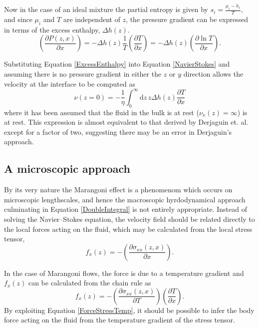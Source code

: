 Now in the case of an ideal mixture the partial entropy is given by $s_{i}=\frac{\mu_{i}-h_{i}}{T}$, and since $\mu_{i}$ and $T$ are independent of $z$, the pressure gradient can be expressed in terms of the excess enthalpy, $\Delta h(z)$.
\begin{equation}
\label{ExcessEnthalpy}
\left(\frac{\partial P(z,x)}{\partial x}\right)= - \Delta h(z)\frac{1}{T} \left( \frac{\partial T}{\partial x} \right) 
= - \Delta h(z) \left( \frac{\partial \ln T}{\partial x} \right).
\end{equation}

Substituting Equation \ref{ExcessEnthalpy} into Equation \ref{NavierStokes} and assuming there is no pressure gradient in either the $z$ or $y$ direction allows the velocity at the interface to be computed as
\begin{equation}
\label{DoubleIntegral}
\nu (z=0) = - \frac{1}{\eta}\int_{0}^{\infty} \mathrm{d}z\, z \Delta h(z) \frac{\partial T}{\partial x}
\end{equation}
where it has been assumed that the fluid in the bulk is at rest ($\nu_{x}(z)=\infty$) is at rest.
This expression is almost equivalent to that derived by Derjaguin et. al. except for a factor of two, suggesting there may be an error in Derjaguin's approach.\cite{SurfaceForces, Anderson}

\subsection{A microscopic approach}
By its very nature the Marangoni effect is a phenomenom which occurs on microscopic lengthscales, and hence the macroscopic hyrdodynamical approach culminating in Equation \ref{DoubleIntegral} is not entirely appropriate.
Instead of solving the Navier--Stokes equation, the velocity field should be  related directly to the local forces acting on the fluid, which may be calculated from the local stress tensor,
\begin{equation}
\label{ForceStress}
f_{x}(z) = - \left( \frac{\partial \sigma_{xx}(z,x)}{\partial x} \right).
\end{equation}

In the case of Marangoni flows, the force is due to a temperature gradient and $f_{x}(z)$ can be calculated from the chain rule as
\begin{equation}
\label{ForceStressTemp}
f_{x}(z) = - \left( \frac{\partial \sigma_{xx}(z,x)}{\partial T} \right) \left( \frac{\partial T}{\partial x} \right).
\end{equation}
By exploiting Equation \ref{ForceStressTemp}, it should be possible to infer the body force acting on the fluid from the temperature gradient of the stress tensor.

